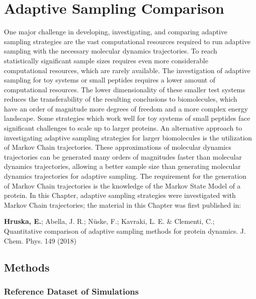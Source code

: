 



\afterpage{\null\newpage}
\chapter{Adaptive Sampling Comparison\label{ch:chapter32}}

One major challenge in developing, investigating, and comparing adaptive sampling strategies are the vast computational resources required to run adaptive sampling with the necessary molecular dynamics trajectories. To reach statistically significant sample sizes requires even more considerable computational resources, which are rarely available.
The investigation of adaptive sampling for toy systems or small peptides requires a lower amount of computational resources. The lower dimensionality of these smaller test systems reduces the transferability of the resulting conclusions to biomolecules, which have an order of magnitude more degrees of freedom and a more complex energy landscape. Some strategies which work well for toy systems of small peptides face significant challenges to scale up to larger proteins. 
An alternative approach to investigating adaptive sampling strategies for larger biomolecules is the utilization of Markov Chain trajectories. These approximations of molecular dynamics trajectories can be generated many orders of magnitudes faster than molecular dynamics trajectories, allowing a better sample size than generating molecular dynamics trajectories for adaptive sampling. The requirement for the generation of Markov Chain trajectories is the knowledge of the Markov State Model of a protein.  In this Chapter, adaptive sampling strategies were investigated with Markov Chain trajectories; the material in this Chapter was first published in: 

\cite{Adstrategies2018} \textbf{Hruska, E.}; Abella, J. R.; N\"uske, F.;
Kavraki, L. E. \& Clementi, C.; Quantitative
comparison of adaptive sampling methods
for protein dynamics. J. Chem. Phys. 149 (2018) 



\section{\label{sec:methods}Methods}


\subsection{\label{sec:methods-dataset}Reference Dataset of Simulations}

